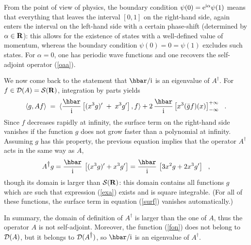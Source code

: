 \documentclass[12pt]{report}
\def\underline{\relax}
\begin{document}
From the point of view of physics, the boundary condition 
$\psi(0) = 
{\rm e}^{\ri \alpha} \psi(1)$ means that everything that 
leaves the interval $[ 0,1]$ on the right-hand side, again enters 
the interval on the left-hand side with a certain phase-shift
(determined by $\alpha \in \br$):
this allows for the existence of states with a well-defined value of
momentum, whereas the boundary condition $\psi(0) = 0 = \psi(1)$
excludes such states. 
For $\alpha =0$, one has periodic wave functions and one 
recovers the self-adjoint operator (\ref{oaa}).

 
\bigskip
 
\underline{{\bf (3b)}}
We now come back to the statement that $\hbar /\ri$ is an eigenvalue of 
$A^{\dag}$.
For $f \in {\cal D}(A) = \st$, 
integration by parts yields
\begin{equation}
\label{surf}
\langle g, A f \rangle \; = \;  \langle \ds{\hbar \over \ri} \left[
(x^3 g)^{\prime} \; + \; 
x^3 g^{\prime} \right] , f \rangle +
2 \, \ds{\hbar \over \ri} \left[
x^3 (\bar g  f)(x) \right]_{-\infty}^{+\infty}
\ \ .
\end{equation}
Since $f$ decreases rapidly at infinity, 
the surface term on the right-hand side vanishes if the function $g$
does not grow faster than a polynomial at infinity. 
Assuming $g$ has this property, 
the previous equation implies that the operator 
$A^{\dag}$ acts in the same way as $A$,
\begin{equation}
\label{exa}
A^{\dag} g = \ds{\hbar \over \ri} \, \left[ (x^3 g)^{\prime}
+x^3 g^{\prime} \right]
= \ds{\hbar \over \ri} \, \left[ 3x^2 g
+ 2 x^3 g^{\prime} \right]
\ \ ,
\end{equation}
though its domain is larger than $\st$:
this domain contains all functions $g$ which are such that  
expression  (\ref{exa}) exists and is square integrable. 
(For all of these functions, the surface term in equation 
(\ref{surf}) vanishes automatically.)
 
In summary, the domain of definition of $A^{\dag}$ is larger 
than the one of $A$, thus the operator $A$ is not self-adjoint. 
Moreover, the function (\ref{fon}) does not belong to ${\cal D}(A)$,
but it belongs to 
${\cal D}
(A^{\dag})$, so $\hbar / \ri$ is an eigenvalue of $A^{\dag}$.
 
\end{document}
